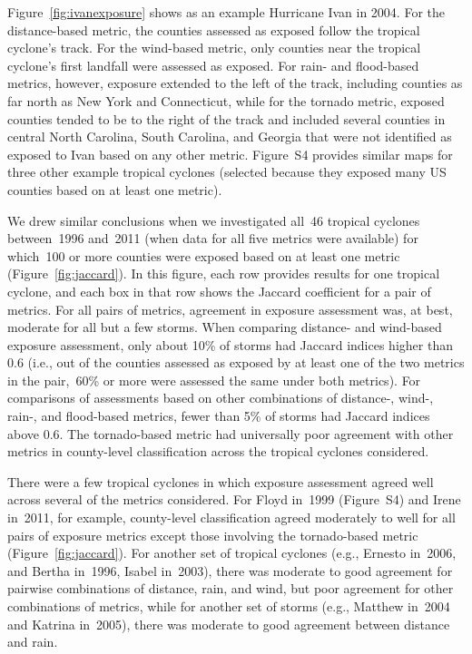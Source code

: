 Figure~\ref{fig:ivanexposure} shows as an example Hurricane Ivan in 2004.
For the distance-based metric, the counties assessed as exposed follow the
tropical cyclone's track. For the wind-based metric,
only counties near the tropical cyclone's first landfall were assessed as
exposed. For rain- and flood-based metrics, however, exposure extended to the
left of the track, including counties as far north as New York and Connecticut,
while for the tornado metric, exposed counties tended to be to the right of the
track and included several counties in central North Carolina, South Carolina,
and Georgia that were not identified as exposed to Ivan based on any other
metric. Figure~S4 provides similar maps for three other example tropical
cyclones (selected because they exposed many \ac{US}  counties based on at
least one metric).

We drew similar conclusions when we investigated all~46 tropical cyclones
between~1996 and~2011 (when data for all five metrics were available) for
which~100 or more counties were exposed based on at least one metric
(Figure~\ref{fig:jaccard}). In this figure, each row provides results for one
tropical cyclone, and each box in that row shows the Jaccard coefficient for a
pair of metrics. For all pairs of metrics, agreement in exposure assessment
was, at best, moderate for all but a few storms. When comparing distance- and
wind-based exposure assessment, only about 10\% of storms had Jaccard indices
higher than 0.6 (i.e., out of the counties assessed as exposed by at least one
of the two metrics in the pair,~60\si{\percent} or more were assessed the same
under both metrics). For comparisons of assessments based on other combinations
of distance-, wind-, rain-, and flood-based metrics, fewer than 5\% of storms
had Jaccard indices above 0.6.  The tornado-based metric had universally poor
agreement with other metrics in county-level classification across the tropical
cyclones considered.  

There were a few tropical cyclones in which exposure assessment agreed well
across several of the metrics considered.  For Floyd in~1999 (Figure~S4) and
Irene in~2011, for example, county-level classification agreed moderately to
well for all pairs of exposure metrics except those involving the tornado-based
metric (Figure~\ref{fig:jaccard}). For another set of tropical cyclones (e.g.,
Ernesto in~2006, and Bertha in~1996, Isabel in~2003), there was moderate to
good agreement for pairwise combinations of distance, rain, and wind, but poor
agreement for other combinations of metrics, while for another set of storms
(e.g., Matthew in~2004 and Katrina in~2005), there was moderate to good
agreement between distance and rain.  




